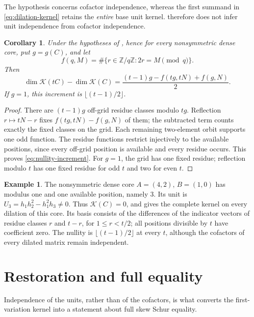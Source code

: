 \documentclass[11pt,a4paper]{amsart}
\numberwithin{equation}{section}
\theoremstyle{plain}
\newtheorem{corollary}[theorem]{Corollary}
\theoremstyle{definition}
\newtheorem{example}[theorem]{Example}
\newcommand{\Z}{\mathbb Z}
\newcommand{\K}{\mathcal K}
\begin{document}
The hypothesis concerns cofactor independence, whereas the first summand in
\eqref{eq:dilation-kernel} retains the \emph{entire} base unit kernel.
 therefore does not infer unit independence from cofactor
independence.

\begin{corollary}\label{cor:nullity-increment}
Under the hypotheses of , hence for every nonsymmetric
dense core, put \(g=g(C)\), and let
\[
 f(q,M)=\#\{r\in\Z/q\Z:2r=M\pmod q\}.
\]
Then
\begin{equation}\label{eq:nullity-increment}
 \dim\K(tC)-\dim\K(C)
 =\frac{(t-1)g-f(tg,tN)+f(g,N)}2.
\end{equation}
If \(g=1\), this increment is \(\lfloor(t-1)/2\rfloor\).
\end{corollary}

\begin{proof}
There are \((t-1)g\) off-grid residue classes modulo \(tg\).
Reflection \(r\mapsto tN-r\) fixes
\(f(tg,tN)-f(g,N)\) of them; the subtracted term counts exactly the fixed
classes on the grid.  Each remaining two-element orbit supports one odd
function.  The residue functions restrict injectively to the available
positions, since every off-grid position is available and every residue
occurs.  This proves \eqref{eq:nullity-increment}.
For \(g=1\), the grid has one fixed residue; reflection modulo \(t\) has
one fixed residue for odd \(t\) and two for even \(t\).
\end{proof}

\begin{example}\label{ex:dilation-ray}
The nonsymmetric dense core \(A=(4,2)\), \(B=(1,0)\) has modulus one and one
available position, namely \(3\).  Its unit is
\(U_3=h_1h_2^2-h_1^2h_3\ne0\).  Thus \(\K(C)=0\), and  gives the complete kernel on
every dilation of this core.  Its basis consists of the differences of the
indicator vectors of residue classes \(r\) and \(t-r\), for
\(1\le r<t/2\); all positions divisible by \(t\) have coefficient zero.
The nullity is \(\lfloor(t-1)/2\rfloor\) at every \(t\), although the
cofactors of every dilated matrix remain independent.
\end{example}

\section{Restoration and full equality}\label{sec:full-equality}

Independence of the units, rather than of the cofactors, is what converts the
first-variation kernel into a statement about full skew Schur equality.
\end{document}
